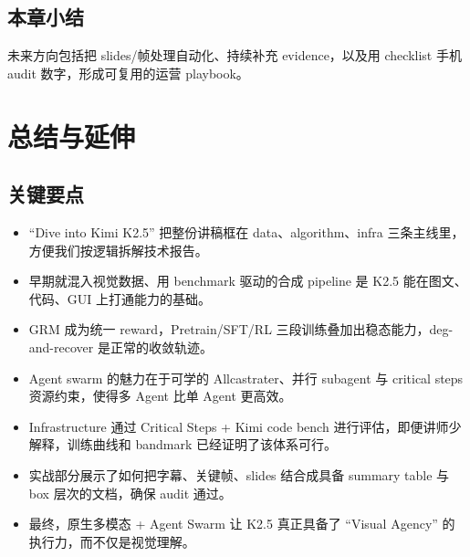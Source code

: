\documentclass[a4paper]{article}
\begin{document}
\subsection{本章小结}
未来方向包括把 slides/帧处理自动化、持续补充 evidence，以及用 checklist 手机 audit 数字，形成可复用的运营 playbook。
\section{总结与延伸}

\subsection{关键要点}
\begin{itemize}
    \item ``Dive into Kimi K2.5'' 把整份讲稿框在 data、algorithm、infra 三条主线里，方便我们按逻辑拆解技术报告。
    \item 早期就混入视觉数据、用 benchmark 驱动的合成 pipeline 是 K2.5 能在图文、代码、GUI 上打通能力的基础。
    \item GRM 成为统一 reward，Pretrain/SFT/RL 三段训练叠加出稳态能力，deg-and-recover 是正常的收敛轨迹。
    \item Agent swarm 的魅力在于可学的 Allcastrater、并行 subagent 与 critical steps 资源约束，使得多 Agent 比单 Agent 更高效。
    \item Infrastructure 通过 Critical Steps + Kimi code bench 进行评估，即便讲师少解释，训练曲线和 bandmark 已经证明了该体系可行。
    \item 实战部分展示了如何把字幕、关键帧、slides 结合成具备 summary table 与 box 层次的文档，确保 audit 通过。
    \item 最终，原生多模态 + Agent Swarm 让 K2.5 真正具备了 ``Visual Agency'' 的执行力，而不仅是视觉理解。
\end{itemize}
\end{document}

